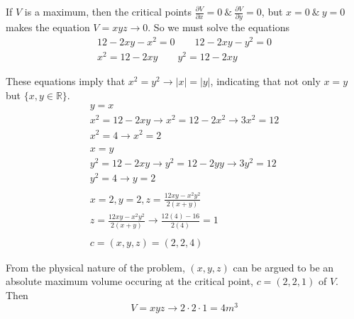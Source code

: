 \documentclass{article}
\begin{document}
  If $ V $ is a maximum, then the critical points $ \frac{\partial V}{\partial x}=0 ~\&~ \frac{\partial V}{\partial y}=0$, but $ x=0 ~\&~ y=0 $ makes the equation $ V=xyz\to0 $. So we must solve the equations
  \[
    \begin{gathered}
    12-2xy-x^{2}=0 \qquad 12-2xy-y^{2}=0\\
    x^{2} = 12-2xy \qquad y^{2}=12-2xy 
    \end{gathered}
  \]

  These equations imply that $ x^{2}=y^{2} \to |x|=|y|$, indicating that not only $ x=y $ but $ \{ x,y \in \mathbb{R} \} $.
  \[
    \begin{gathered}
    y=x\\  
    x^{2}=12-2xy \to x^{2}= 12-2x^{2} \to 3x^{2}=12\\
    x^{2}=4 \to x^{2}=2\\
    ~\\
    x=y\\
    y^{2}=12-2xy \to y^{2}=12-2yy \to 3y^{2}=12\\
    y^{2}=4 \to y=2\\
    ~\\
    x=2,y=2,z=\frac{12xy-x^{2}y^{2}}{2(x+y)}
    ~\\
    z=\frac{12xy-x^{2}y^{2}}{2(x+y)}\to \frac{12(4)-16}{2(4)}=1\\
    ~\\
    c=(x,y,z)=(2,2,4) 
    \end{gathered}
  \]

  From the physical nature of the problem, $ (x,y,z) $ can be argued to be an absolute maximum volume occuring at the critical point, $ c=(2,2,1) $ of $ V $. Then
  \[
  V=xyz\to2 \cdot 2 \cdot 1 = 4m^{3}  
  \]
  
\end{document}
